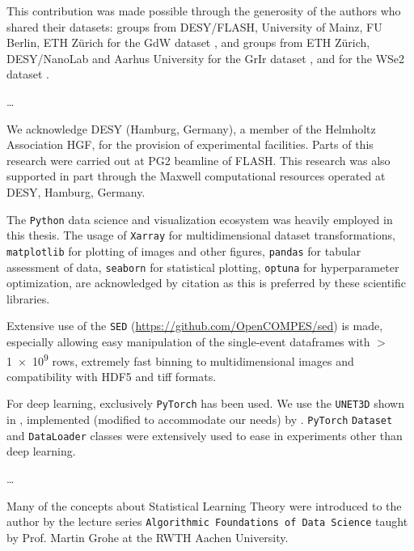 
This contribution was made possible through the generosity of the authors who shared their datasets: groups from DESY/FLASH, University of Mainz, FU Berlin, ETH Zürich for the \gls{GdW} dataset \cite{kutnyakhovMultidimensionalPhotoemissionSpectra2024}, \citeauthor{heberMultispectralTimeresolvedEnergy2022} and groups from ETH Zürich, DESY/NanoLab and Aarhus University for the \gls{GrIr} dataset \cite{heberMultispectralTimeresolvedEnergy2022}, and \citeauthor{maklarTimeresolvedARPESRAW2022} for the \gls{WSe2} dataset \cite{maklarTimeresolvedARPESRAW2022}.

\dots

We acknowledge DESY (Hamburg, Germany), a member of the Helmholtz Association HGF, for the provision of experimental facilities. Parts of this research were carried out at PG2 beamline of FLASH. This research was also supported in part through the Maxwell computational resources operated at DESY, Hamburg, Germany.

The \texttt{Python} data science and visualization ecosystem was heavily employed in this thesis.
The usage of \texttt{Xarray} \cite{hoyerXarrayNDLabeled2017} for multidimensional dataset transformations, \texttt{matplotlib} \cite{hunterMatplotlib2DGraphics2007} for plotting of images and other figures, \texttt{pandas} \cite{thepandasdevelopmentteamPandasdevPandasPandas2024} for tabular assessment of data, \texttt{seaborn} \cite{waskomSeabornStatisticalData2021} for statistical plotting, \texttt{optuna} \cite{akibaOptunaNextgenerationHyperparameter2019} for hyperparameter optimization, are acknowledged by citation as this is preferred by these scientific libraries. 

Extensive use of the \texttt{SED} (\href{https://github.com/OpenCOMPES/sed}{https://github.com/OpenCOMPES/sed}) is made, especially allowing easy manipulation of the single-event dataframes with $>$\num{1e9} rows, extremely fast binning to multidimensional images and compatibility with HDF5 and tiff formats.

For deep learning, exclusively \texttt{PyTorch} \cite{paszkePyTorchImperativeStyle2019} has been used. We use the \texttt{UNET3D} shown in \cite{cicek3DUNetLearning2016}, implemented (modified to accommodate our needs) by \citeauthor{wolnyAccurateVersatile3D2020} \cite{wolnyAccurateVersatile3D2020}. \texttt{PyTorch} \texttt{Dataset} and \texttt{DataLoader} classes were extensively used to ease in experiments other than deep learning.


\dots

Many of the concepts about Statistical Learning Theory were introduced to the author by the lecture series \texttt{Algorithmic Foundations of Data Science} taught by Prof. Martin Grohe at the RWTH Aachen University.
